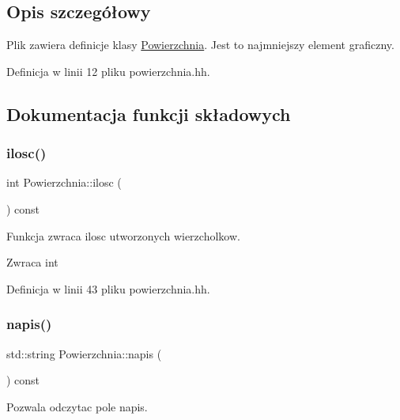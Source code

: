 \subsection{Opis szczegółowy}
Plik zawiera definicje klasy \mbox{\hyperlink{class_powierzchnia}{Powierzchnia}}. Jest to najmniejszy element graficzny. 

Definicja w linii 12 pliku powierzchnia.\+hh.



\subsection{Dokumentacja funkcji składowych}
\mbox{\label{class_powierzchnia_aaccea9358f37f18de45e0afddd84c93d}} 
\subsubsection{\texorpdfstring{ilosc()}{ilosc()}}
{\footnotesize\ttfamily int Powierzchnia\+::ilosc (\begin{DoxyParamCaption}{ }\end{DoxyParamCaption}) const\hspace{0.3cm}{\ttfamily [inline]}}

Funkcja zwraca ilosc utworzonych wierzcholkow.

\begin{DoxyReturn}{Zwraca}
int 
\end{DoxyReturn}


Definicja w linii 43 pliku powierzchnia.\+hh.

\mbox{\label{class_powierzchnia_ab6ff9b19f96772931a2861fde2f14ade}} 
\subsubsection{\texorpdfstring{napis()}{napis()}}
{\footnotesize\ttfamily std\+::string Powierzchnia\+::napis (\begin{DoxyParamCaption}{ }\end{DoxyParamCaption}) const\hspace{0.3cm}{\ttfamily [inline]}}

Pozwala odczytac pole napis.


